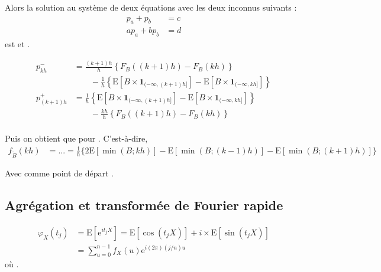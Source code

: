 \documentclass[10pt, french]{article}
\begin{document}
\begin{multicols*}{2}
\begin{definitionNOHFILLpropos}[Lemme]
Alors la solution au système de deux équations avec les deux inconnus suivants : 
\begin{align*}
	p_{a}	+	p_{b}	&=	c	\\
	ap_{a}	+	bp_{b}	&=	d
\end{align*}
est  et .
\end{definitionNOHFILLpropos}

\begin{definitionNOHFILLprop}
\setlength{\mathindent}{-1cm}
\begin{align*}
	p^{-}_{kh}
	&=	\frac{(k + 1)h}{h} \left\{
			F_{B}((k + 1)h)	-	F_{B}(kh)
		\right\}		\\	&\quad\quad	-	\frac{1}{h} \left\{
			\text{E}[B \times \bm{1}_{(-\infty, (k + 1)h]}]	-	\text{E}[B \times \bm{1}_{(-\infty, kh]}]	
		\right\}	\\
	p^{+}_{(k + 1)h}
	&=	\frac{1}{h} \left\{
			\text{E}[B \times \bm{1}_{(-\infty, (k + 1)h]}]	-	\text{E}[B \times \bm{1}_{(-\infty, kh]}]
		\right\}			\\	&\quad\quad -\frac{kh}{h} \left\{
			F_{B}((k + 1)h)	-	F_{B}(kh)
		\right\}		\\
\end{align*}

Puis on obtient que pour  . C'est-à-dire, 
\begin{align*}
	f_{\tilde{B}}(kh)
	&=	...
	=	\frac{1}{h}	\bigg\{
		2\text{E}[\min(B; kh)]	-	\text{E}[\min(B; (k - 1)h)]		-	\text{E}[\min(B; (k + 1)h)]	
		\bigg\}
\end{align*}
\setlength{\mathindent}{1cm}

Avec comme point de départ .

\end{definitionNOHFILLprop}

\columnbreak
\subsection{Agrégation et transformée de Fourier rapide}
\begin{align*}
	\varphi_{X}(t_{j})
	&=	\text{E}[\textrm{e}^{it_{j}X}]
	=	\text{E}[\cos(t_{j}X)] + i \times \text{E}[\sin(t_{j}X)]	\\
	&=	\sum_{u = 0}^{n - 1} f_{X}(u) \textrm{e}^{i (2\pi) (j / n) u}
\end{align*}
où .


\end{multicols*}
\end{document}
